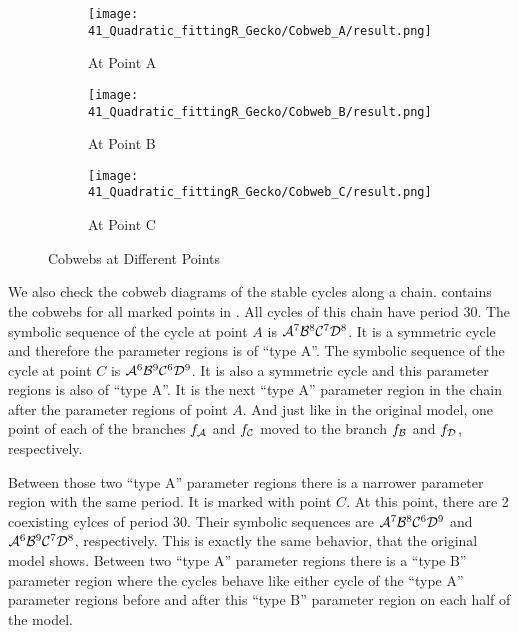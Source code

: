 \begin{figure}
	\centering
	\begin{subfigure}{0.3\textwidth}
		\centering
		\texttt{[image: 41\_Quadratic\_fittingR\_Gecko/Cobweb\_A/result.png]}
		\caption{At Point A}
		\label{fig:setup.quad.hyper.2.cobweb.A}
	\end{subfigure}
	\begin{subfigure}{0.3\textwidth}
		\centering
		\texttt{[image: 41\_Quadratic\_fittingR\_Gecko/Cobweb\_B/result.png]}
		\caption{At Point B}
		\label{fig:setup.quad.hyper.2.cobweb.B}
	\end{subfigure}
	\begin{subfigure}{0.3\textwidth}
		\centering
		\texttt{[image: 41\_Quadratic\_fittingR\_Gecko/Cobweb\_C/result.png]}
		\caption{At Point C}
		\label{fig:setup.quad.hyper.2.cobweb.C}
	\end{subfigure}
	\caption{Cobwebs at Different Points}
	\label{fig:setup.quad.hyper.2.cobwebs}
\end{figure}

We also check the cobweb diagrams of the stable cycles along a chain.
 contains the cobwebs for all marked points in .
All cycles of this chain have period $30$.
The symbolic sequence of the cycle at point $A$ is $\mathcal{A}^7\mathcal{B}^8\mathcal{C}^7\mathcal{D}^8$.
It is a symmetric cycle and therefore the parameter regions is of ``type A''.
The symbolic sequence of the cycle at point $C$ is $\mathcal{A}^6\mathcal{B}^9\mathcal{C}^6\mathcal{D}^9$.
It is also a symmetric cycle and this parameter regions is also of ``type A''.
It is the next ``type A'' parameter region in the chain after the parameter regions of point $A$.
And just like in the original model, one point of each of the branches $f_{\mathcal{A}}$ and $f_{\mathcal{C}}$ moved to the branch $f_{\mathcal{B}}$ and $f_{\mathcal{D}}$, respectively.

Between those two ``type A'' parameter regions there is a narrower parameter region with the same period.
It is marked with point $C$.
At this point, there are 2 coexisting cylces of period 30.
Their symbolic sequences are $\mathcal{A}^7\mathcal{B}^8\mathcal{C}^6\mathcal{D}^9$ and $\mathcal{A}^6\mathcal{B}^9\mathcal{C}^7\mathcal{D}^8$, respectively.
This is exactly the same behavior, that the original model shows.
Between two ``type A'' parameter regions there is a ``type B'' parameter region where the cycles behave like either cycle of the ``type A'' parameter regions before and after this ``type B'' parameter region on each half of the model.
